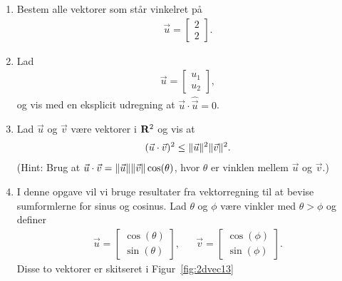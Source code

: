 \begin{enumerate}
	
	\item Bestem alle vektorer som står vinkelret på
	\begin{align*}
	\vec{u}=\begin{bmatrix}
	2\\2
	\end{bmatrix}.
	\end{align*}
	
	
	\item Lad 
	\begin{align*}
	\vec{u}=\begin{bmatrix}
	u_1\\u_2
	\end{bmatrix},
	\end{align*}
	og vis med en eksplicit udregning at $\vec{u}\cdot \hat{\vec{u}}=0$.
	
	
	\item\label{it:2dvec11} Lad $\vec{u}$ og $\vec{v}$ være vektorer i $\mathbf{R}^2$ og vis at 
	\begin{align*}
	(\vec{u}\cdot \vec{v})^2\leq \Vert \vec{u}\Vert^2 \Vert \vec{v}\Vert^2.
	\end{align*}
	(Hint: Brug at $ \vec{u}\cdot \vec{v} =\Vert \vec{u}\Vert\Vert \vec{v}\Vert\cos(\theta) $, hvor $\theta$ er vinklen mellem $\vec{u}$ og $\vec{v}$.)
	
	\item\label{it:2dvec13} I denne opgave vil vi bruge resultater fra vektorregning til at bevise sumformlerne for sinus og cosinus. Lad $\theta$ og $\phi$ være vinkler med $\theta>\phi$ og definer
	\begin{align*}
	\vec{u}=\begin{bmatrix}
	\cos(\theta)\\\sin(\theta)
	\end{bmatrix},&& \vec{v}=\begin{bmatrix}
	\cos(\phi)\\\sin(\phi)
	\end{bmatrix}.
	\end{align*}
	Disse to vektorer er skitseret i Figur~\ref{fig:2dvec13}
	\begin{figure}
		\centering
\end{figure}
\end{enumerate}
